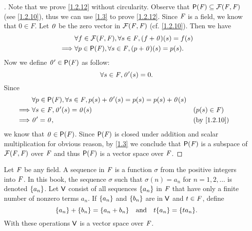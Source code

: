 \begin{proof}[]
	Note that we prove \cref{1.2.12} without circularity.
	Observe that \(\ps{\F} \subseteq \fs{\F}{\F}\) (see \cref{1.2.10}), thus we can use \cref{1.3} to prove \cref{1.2.12}.
	Since \(\mathit{F}\) is a field, we know that \(0 \in F\).
	Let \(\mathit{0}\) be the zero vector in \(\fs{\F}{\F}\) (cf. \cref{1.2.10}).
	Then we have
	\begin{align*}
		         & \forall f \in \fs{\F}{\F}, \forall s \in \F, (f + \zv)(s) = f(s) \\
		\implies & \forall p \in \ps{\F}, \forall s \in \F, (p + \zv)(s) = p(s).
	\end{align*}
	Now we define \(\zv' \in \ps{F}\) as follow:
	\[
		\forall s \in \mathit{F}, \mathit{0}'(s) = 0.
	\]
	Since
	\begin{align*}
		         & \forall p \in \ps{\F}, \forall s \in \F, p(s) + \zv'(s) = p(s) = p(s) + \zv(s)                                \\
		\implies & \forall s \in \F, \zv'(s) = \zv(s)                                             &  & (p(s) \in \F)             \\
		\implies & \zv' = \zv,                                                                    &  & \text{(by \cref{1.2.10})}
	\end{align*}
	we know that \(\zv \in \ps{\F}\).
	Since \(\ps{\F}\) is closed under addition and scalar multiplication for obvious reason, by \cref{1.3} we conclude that \(\ps{\F}\) is a subspace of \(\fs{\F}{\F}\) over \(\mathit{F}\) and thus \(\ps{\F}\) is a vector space over \(\mathit{F}\).
\end{proof}

\begin{eg}\label{1.2.13}
	Let \(\mathit{F}\) be any field.
	A sequence in \(\mathit{F}\) is a function \(\sigma\) from the positive integers into \(\mathit{F}\).
	In this book, the sequence \(\sigma\) such that \(\sigma(n) = a_n\) for \(n = 1, 2, \dots\) is denoted \(\left\lbrace a_n\right\rbrace\).
	Let \(\mathsf{V}\) consist of all sequences \(\left\lbrace a_n\right\rbrace\) in \(\mathit{F}\) that have only a finite number of nonzero terms \(a_n\).
	If \(\left\lbrace a_n\right\rbrace\) and \(\left\lbrace b_n\right\rbrace\) are in \(\mathsf{V}\) and \(t \in \mathit{F}\), define
	\[
		\set{a_n} + \set{b_n} = \set{a_n + b_n} \quad \text{and} \quad t\set{a_n} = \set{ta_n}.
	\]
	With these operations \(\mathsf{V}\) is a vector space over \(\mathit{F}\).
\end{eg}

